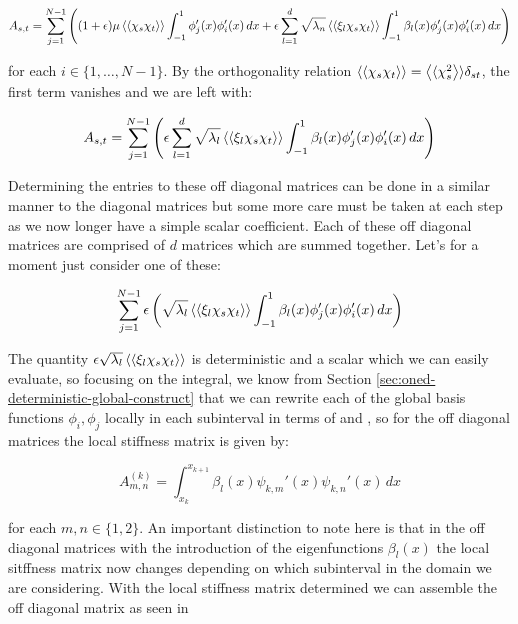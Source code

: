 \begin{equation}\label{eq:oned-stochastic-off-diagonal-stiffness}
    A_{s,t} = \sum_{j=1}^{N - 1}\left((1 + \epsilon)\mu\left\langle\langle\chi_s\chi_t\right\rangle\rangle
        \int_{-1}^1 \phi_j'(x)\phi_i'(x)\, dx
       + \epsilon\sum_{l=1}^d\sqrt{\lambda_n}\left\langle\langle\xi_l\chi_s\chi_t\right\rangle\rangle
       \int_{-1}^1 \beta_l(x)\phi_j'(x)\phi_i'(x)\, dx\right)
\end{equation}

for each $i \in \{1,\ldots,N-1\}$. By the orthogonality relation
$\left\langle\langle\chi_s\chi_t\right\rangle\rangle = \left\langle\langle\chi_s^2\right\rangle\rangle\delta_{st}$, the first term vanishes
and we are left with:

\begin{equation}
    A_{s,t} = \sum_{j=1}^{N - 1}\left(
        \epsilon\sum_{l=1}^d\sqrt{\lambda_l}\left\langle\langle\xi_l\chi_s\chi_t\right\rangle\rangle
            \int_{-1}^1\beta_l(x)\phi_j'(x)\phi_i'(x)\, dx\right)
\end{equation}

Determining the entries to these off diagonal matrices can be done in a similar
manner to the diagonal matrices but some more care must be taken at each step
as we now longer have a simple scalar coefficient. Each of these off diagonal
matrices are comprised of $d$ matrices which are summed together. Let's for a
moment just consider one of these:

\begin{equation}
    \sum_{j=1}^{N - 1}\epsilon\left(\sqrt{\lambda_l}\left\langle\langle\xi_l\chi_s\chi_t\right\rangle\rangle
        \int_{-1}^1\beta_l(x)\phi_j'(x)\phi_i'(x)\, dx\right)
\end{equation}

The quantity $\epsilon\sqrt{\lambda_l}\left\langle\langle\xi_l\chi_s\chi_t\right\rangle\rangle$ is
deterministic and a scalar which we can easily evaluate, so focusing on the
integral, we know from Section \ref{sec:oned-deterministic-global-construct}
that we can rewrite each of the global basis functions $\phi_i,\phi_j$ locally
in each subinterval in terms of  and
, so for the off diagonal matrices the local
stiffness matrix is given by:

\begin{equation}
    A^{(k)}_{m,n} = \int_{x_k}^{x_{k+1}}
        \beta_l(x)\psi_{k,m}'(x)\psi_{k,n}'(x)\, dx
\end{equation}

for each $m, n \in \{1, 2\}$. An important distinction to note here is that in
the off diagonal matrices with the introduction of the eigenfunctions
$\beta_l(x)$ the local sitffness matrix now changes depending on which
subinterval in the domain we are considering. With the local stiffness matrix
determined we can assemble the off diagonal matrix as seen in


